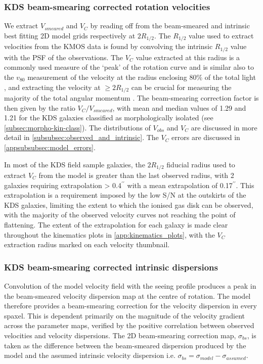 \documentclass[fleqn,usenatbib]{mn2e}
\begin{document}
\subsubsection{KDS beam-smearing corrected rotation velocities}\label{subsubsec:beam_smearing_corrected_velocities}
We extract $V_{smeared}$ and $V_{C}$ by reading off from the beam-smeared and intrinsic best fitting 2D model grids respectively at $2R_{1/2}$.
The $R_{1/2}$ value used to extract velocities from the KMOS data is found by convolving the intrinsic $R_{1/2}$ value with the PSF of the observations.
The $V_{C}$ value extracted at this radius is a commonly used measure of the `peak' of the rotation curve \citep[e.g.][]{Miller2011,Pelliccia2016,Stott2016,Harrison2017} and is similar also to the $v_{80}$ measurement of the velocity at the radius enclosing 80$\%$ of the total light \citep{Tiley2016a}, and extracting the velocity at $\geqslant 2R_{1/2}$ can be crucial for measuring the majority of the total angular momentum \citep[e.g.]{Obreschkow2015,Harrison2017}.
The beam-smearing correction factor is then given by the ratio $V_{C}/V_{smeared}$, with mean and median values of 1.29 and 1.21 for the KDS galaxies classified as morphologically isolated (see \cref{subsec:morpho-kin-class}).
The distributions of $V_{obs}$ and $V_{C}$ are discussed in more detail in \cref{subsubsec:observed_and_intrinsic}.
The $V_{C}$ errors are discussed in \cref{appsubsubsec:model_errors}.

In most of the KDS field sample galaxies, the $2R_{1/2}$ fiducial radius used to extract $V_{C}$ from the model is greater than the last observed radius, with 2 galaxies requiring extrapolation > 0.4$^{\prime\prime}$ with a mean extrapolation of 0.17$^{\prime\prime}$.
This extrapolation is a requirement imposed by the low S/N at the outskirts of the KDS galaxies, limiting the extent to which the ionised gas disk can be observed, with the majority of the observed velocity curves not reaching the point of flattening. 
The extent of the extrapolation for each galaxy is made clear throughout the kinematics plots in \cref{app:kinematics_plots}, with the $V_{C}$ extraction radius marked on each velocity thumbnail.


\subsubsection{KDS beam-smearing corrected intrinsic dispersions}\label{subsubsec:beam_smearing_corrected_dispersions}
Convolution of the model velocity field with the seeing profile produces a peak in the beam-smeared velocity dispersion map at the centre of rotation.
The model therefore provides a beam-smearing correction for the velocity dispersion in every spaxel.
This is dependent primarily on the magnitude of the velocity gradient across the parameter maps, verified by the positive correlation between observed velocities and velocity dispersions.
The 2D beam-smearing correction map, $\sigma_{bs}$, is taken as the difference between the beam-smeared dispersion produced by the model and the assumed intrinsic velocity dispersion i.e. $\sigma_{bs} = \sigma_{model} - \sigma_{assumed}$.
\end{document}
